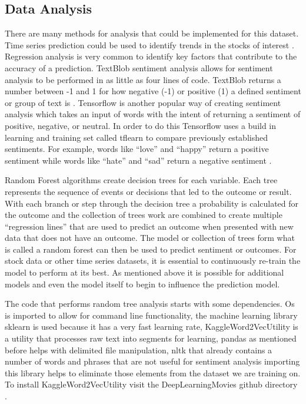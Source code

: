 \documentclass[sigconf]{acmart}
\begin{document}
\subsection{Data Analysis}
There are many methods for analysis that could be implemented for this dataset. Time series prediction could be used to identify trends in the stocks of interest \cite{ARMANO}. Regression analysis is very common to identify key factors that contribute to the accuracy of a  prediction. TextBlob sentiment analysis allows for sentiment analysis to be performed in as little as four lines of code. TextBlob returns a number between -1 and 1 for how negative (-1) or positive (1) a defined sentiment or group of text is \cite{www-textblob}. Tensorflow is another popular way of creating sentiment analysis which takes an input of words with the intent of returning a sentiment of positive, negative, or neutral. In order to do this Tensorflow uses a build in learning and training set called tflearn to compare previously established sentiments. For example, words like ``love'' and ``happy'' return a positive sentiment while words like ``hate'' and ``sad'' return a negative sentiment \cite{www-oreilyTensor}. 

Random Forest algorithms create decision trees for each variable. Each tree represents the sequence of events or decisions that led to the outcome or result. With each branch or step through the decision tree a probability is calculated for the outcome and the collection of trees work are combined to create multiple ``regression lines'' that are used to predict an outcome when presented with new data that does not have an outcome. The model or collection of trees form what is called a random forest can then be used to predict sentiment or outcomes. For stock data or other time series datasets, it is essential to continuously re-train the model to perform at its best. As mentioned above it is possible for additional models and even the model itself to begin to influence the prediction model. 

The code that performs random tree analysis starts with some dependencies. Os is imported to allow for command line functionality, the machine learning library sklearn is used because it has a very fast learning rate, KaggleWord2VecUtility is a utility that processes raw text into segments for learning, pandas as mentioned before helps with delimited file manipulation, nltk that already contains a number of words and phrases that are not useful for sentiment analysis importing this library helps to eliminate those elements from the dataset we are training on. To install KaggleWord2VecUtility visit the DeepLearningMovies github directory \cite{kaggle}. 
\end{document}
